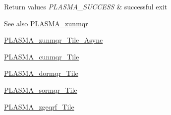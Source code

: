 \begin{DoxyRetVals}{Return values}
{\em P\+L\+A\+S\+M\+A\+\_\+\+S\+U\+C\+C\+E\+S\+S} & successful exit\\
\hline
\end{DoxyRetVals}
\begin{DoxySeeAlso}{See also}
\hyperlink{group__PLASMA__Complex64__t_ga2a00379e9ae15c89c8a21d7dfa945e8f_ga2a00379e9ae15c89c8a21d7dfa945e8f}{P\+L\+A\+S\+M\+A\+\_\+zunmqr} 

\hyperlink{group__PLASMA__Complex64__t__Tile__Async_ga65bce78bfc91e50cd35cdb87521ce9a4_ga65bce78bfc91e50cd35cdb87521ce9a4}{P\+L\+A\+S\+M\+A\+\_\+zunmqr\+\_\+\+Tile\+\_\+\+Async} 

\hyperlink{group__PLASMA__Complex32__t__Tile_ga2ac6814a64f31e0b1659a8f94b621a1d_ga2ac6814a64f31e0b1659a8f94b621a1d}{P\+L\+A\+S\+M\+A\+\_\+cunmqr\+\_\+\+Tile} 

\hyperlink{group__double__Tile_ga1371def6d97c0194d43a018f448013b6_ga1371def6d97c0194d43a018f448013b6}{P\+L\+A\+S\+M\+A\+\_\+dormqr\+\_\+\+Tile} 

\hyperlink{group__float__Tile_ga3fdeed46ef1d25052ce1535bfd40c07e_ga3fdeed46ef1d25052ce1535bfd40c07e}{P\+L\+A\+S\+M\+A\+\_\+sormqr\+\_\+\+Tile} 

\hyperlink{group__PLASMA__Complex64__t__Tile_gabc10a21174d94b348a2493d6e885be57_gabc10a21174d94b348a2493d6e885be57}{P\+L\+A\+S\+M\+A\+\_\+zgeqrf\+\_\+\+Tile} 
\end{DoxySeeAlso}
